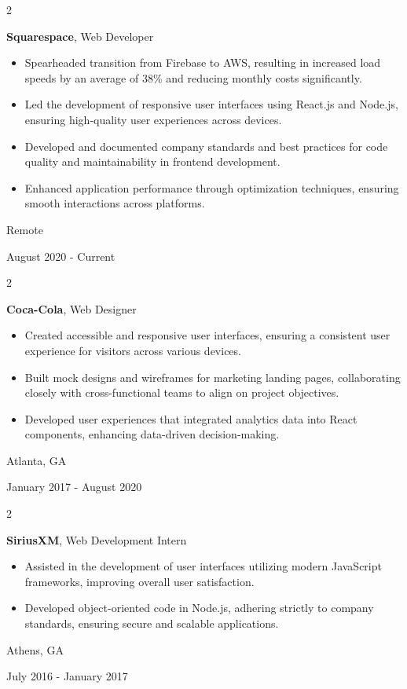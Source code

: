 \documentclass[10pt, letterpaper]{article}
\newenvironment{highlights}{
    \begin{itemize}[
        topsep=0.10 cm,
        parsep=0.10 cm,
        partopsep=0pt,
        itemsep=0pt,
        leftmargin=0.4 cm + 10pt
    ]
}{
    \end{itemize}
} %
\newenvironment{twocolentry}[2][]{
    \onecolentry
    \def\secondColumn{#2}
    \setcolumnwidth{\fill, 4.5 cm}
    \begin{paracol}{2}
}{
    \switchcolumn \raggedleft \secondColumn
    \end{paracol}
    \endonecolentry
} %
\begin{document}
        \begin{twocolentry}{
            Remote

            August 2020 - Current
        }
            \textbf{Squarespace}, Web Developer
            \begin{highlights}
                \item Spearheaded transition from Firebase to AWS, resulting in increased load speeds by an average of 38\% and reducing monthly costs significantly.
                \item Led the development of responsive user interfaces using React.js and Node.js, ensuring high-quality user experiences across devices.
                \item Developed and documented company standards and best practices for code quality and maintainability in frontend development.
                \item Enhanced application performance through optimization techniques, ensuring smooth interactions across platforms.
            \end{highlights}
        \end{twocolentry}

        \vspace{0.2 cm}

        \begin{twocolentry}{
            Atlanta, GA

            January 2017 - August 2020
        }
            \textbf{Coca-Cola}, Web Designer
            \begin{highlights}
                \item Created accessible and responsive user interfaces, ensuring a consistent user experience for visitors across various devices.
                \item Built mock designs and wireframes for marketing landing pages, collaborating closely with cross-functional teams to align on project objectives.
                \item Developed user experiences that integrated analytics data into React components, enhancing data-driven decision-making.
            \end{highlights}
        \end{twocolentry}

        \vspace{0.2 cm}

        \begin{twocolentry}{
            Athens, GA

            July 2016 - January 2017
        }
            \textbf{SiriusXM}, Web Development Intern
            \begin{highlights}
                \item Assisted in the development of user interfaces utilizing modern JavaScript frameworks, improving overall user satisfaction.
                \item Developed object-oriented code in Node.js, adhering strictly to company standards, ensuring secure and scalable applications.
            \end{highlights}
        \end{twocolentry}
\end{document}
